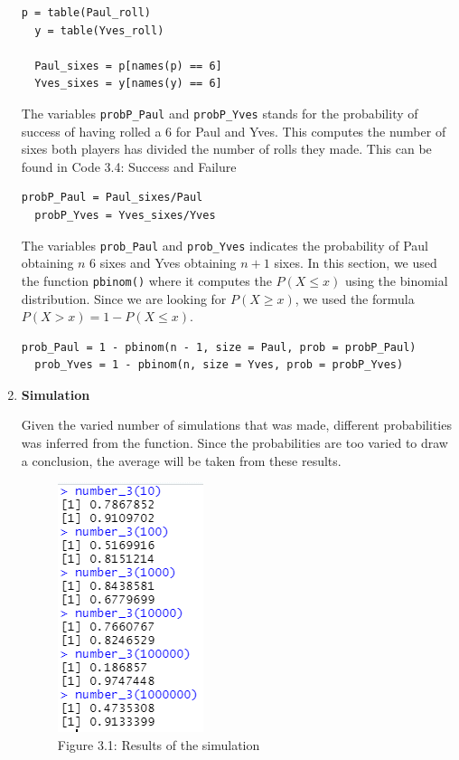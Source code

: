 \documentclass[12pt,letterpaper]{article}
\newcommand{\code}[1]{\colorbox{light-gray}{\texttt{#1}}}
\begin{document}
\begin{enumerate}[label=\Alph*]
          \begin{lstlisting}[title=\footnotesize Code 3.3: Counting]
  p = table(Paul_roll)
  y = table(Yves_roll)

  Paul_sixes = p[names(p) == 6]
  Yves_sixes = y[names(y) == 6]
          \end{lstlisting}

        The variables \code{probP\_Paul} and \code{probP\_Yves} stands for the probability of success of having rolled a 6 for Paul and Yves. This computes the number of sixes both players has divided the number of rolls they made. This can be found in Code 3.4: Success and Failure

          \begin{lstlisting}[title=\footnotesize Code 3.4: Success and Failure]
  probP_Paul = Paul_sixes/Paul
  probP_Yves = Yves_sixes/Yves
          \end{lstlisting}

        The variables \code{prob\_Paul} and \code{prob\_Yves} indicates the probability of Paul obtaining $n$ 6 sixes and Yves obtaining $n + 1$ sixes. In this section, we used the function \code{pbinom()} where it computes the $P(X \leq x)$ using the binomial distribution. Since we are looking for $P(X \geq x)$, we used the formula $P(X > x) = 1 - P(X \leq x)$.

          \begin{lstlisting}[title=\footnotesize Code 3.5: Probability]
  prob_Paul = 1 - pbinom(n - 1, size = Paul, prob = probP_Paul)
  prob_Yves = 1 - pbinom(n, size = Yves, prob = probP_Yves) 
          \end{lstlisting}
        
        \newpage
      \item \textbf{Simulation}  
        
        Given the varied number of simulations that was made, different probabilities was inferred from the function. Since the probabilities are too varied to draw a conclusion, the average will be taken from these results.

        \begin{figure}[h]
          \centering
          \includegraphics{fig3.1.png}
          \caption*{\footnotesize Figure 3.1: Results of the simulation}
        \end{figure}


\end{enumerate}
\end{document}
